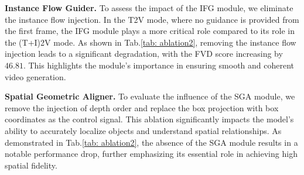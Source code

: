 \noindent \textbf{Instance Flow Guider.}
To assess the impact of the IFG module, we eliminate the instance flow injection. In the T2V mode, where no guidance is provided from the first frame, the IFG module plays a more critical role compared to its role in the (T+I)2V mode. As shown in Tab.\ref{tab: ablation2}, removing the instance flow injection leads to a significant degradation, with the FVD score increasing by $46.81$. This highlights the module’s importance in ensuring smooth and coherent video generation.

\noindent \textbf{Spatial Geometric Aligner.}
To evaluate the influence of the SGA module, we remove the injection of depth order and replace the box projection with box coordinates as the control signal. 
This ablation significantly impacts the model’s ability to accurately localize objects and understand spatial relationships. As demonstrated in Tab.\ref{tab: ablation2}, the absence of the SGA module results in a notable performance drop, further emphasizing its essential role in achieving high spatial fidelity.





\begin{table}[tb]
    \centering
    \footnotesize
        \centering
        \caption{Ablation study results in T2V scenarios on the generated nuScenes validation set.}
        \label{tab: ablation2}
\end{table}












